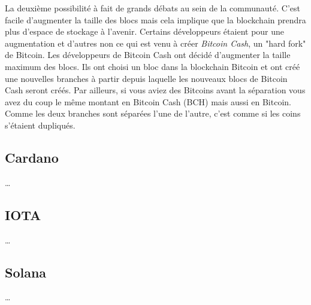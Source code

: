 La deuxième possibilité à fait de grands débats au sein de la communauté. C'est facile d'augmenter la taille des blocs mais cela implique que la blockchain prendra plus d'espace de stockage à l'avenir. Certains développeurs étaient pour une augmentation et d'autres non ce qui est venu à créer \emph{Bitcoin Cash}, un "hard fork" de Bitcoin. Les développeurs de Bitcoin Cash ont décidé d'augmenter la taille maximum des blocs. Ils ont choisi un bloc dans la blockchain Bitcoin et ont créé une nouvelles branches à partir depuis laquelle les nouveaux blocs de Bitcoin Cash seront créés. Par ailleurs, si vous aviez des Bitcoins avant la séparation vous avez du coup le même montant en Bitcoin Cash (BCH) mais aussi en Bitcoin. Comme les deux branches sont séparées l'une de l'autre, c'est comme si les coins s'étaient dupliqués.

\subsection{Cardano}

\dots

\subsection{IOTA}

\dots

\subsection{Solana}

\dots